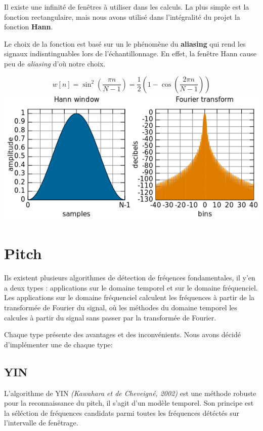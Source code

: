 \documentclass[]{article}
\begin{document}
Il existe une infinité de fenêtres à utiliser dans les calculs. La plus
simple est la fonction rectangulaire, mais nous avons utilisé dans
l'intégralité du projet la fonction \textbf{Hann}.

Le choix de la fonction est basé sur un le phénomène du
\textbf{aliasing} qui rend les signaux indisntinguables lors de
l'échantillonnage. En effet, la fenêtre Hann cause peu de
\emph{aliasing} d'où notre choix.

\[w[n] = \sin^2\left(\frac{\pi n}{N -1}\right) =\frac{1}{2}\left(1-\cos\left(\frac{2\pi n}{N -1}\right)\right)\]
\includegraphics{img/Hann.png}

\hypertarget{pitch}{%
\section{Pitch}\label{pitch}}

Ils existent plusieurs algorithmes de détection de fréqences
fondamentales, il y'en a deux types : applications sur le domaine
temporel et sur le domaine fréquenciel. Les applications sur le domaine
fréquenciel calculent les fréquences à partir de la transformée de
Fourier du signal, où les méthodes du domaine temporel les calcules à
partir du signal sans passer par la transformée de Fourier.

Chaque type présente des avantages et des inconvénients. Nous avons
décidé d'implémenter une de chaque type:

\hypertarget{yin}{%
\subsection{YIN}\label{yin}}

L'algorithme de YIN \emph{(Kawahara et de Cheveigné, 2002)} est une
méthode robuste pour la reconnaissance du pitch, il s'agit d'un modèle
temporel. Son principe est la séléction de fréquences candidats parmi
toutes les fréquences détéctés sur l'intervalle de fenêtrage.
\end{document}
